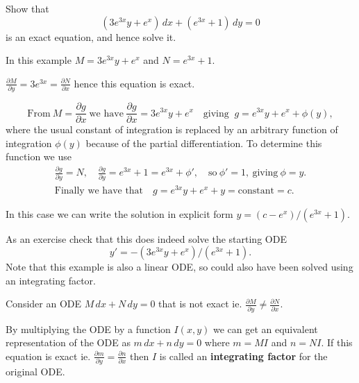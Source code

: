 \begin{example}
    Show that \[(3e^{3x}y+e^x)\,dx+(e^{3x}+1)\,dy=0\] is an exact equation, and hence solve it.
    
    In this example $M=3e^{3x}y+e^x$ and $N=e^{3x}+1.$

    $\frac{\partial M}{\partial y}=3e^{3x}=\frac{\partial N}{\partial x}$
    hence this equation is exact.

    \[\text{From} \ M=\frac{\partial g}{\partial x}\ \text{we have} \ \frac{\partial g}{\partial x}=3e^{3x}y+e^x \quad \text{giving } \ g=e^{3x}y+e^x+\phi(y),\]
    where the usual constant of integration is replaced by an arbitrary function of integration $\phi(y)$ because of the partial differentiation. To determine this function we use
    \begin{equation}
        \begin{gathered}
            \frac{\partial g}{\partial y}=N, \quad \frac{\partial g}{\partial y}=e^{3x}+1=e^{3x}+\phi', \quad \text{so} \ \phi'=1, \ \text{giving} \ \phi=y. \\
            \text{Finally we have that}\quad g=e^{3x}y+e^x+y=\text{constant}=c.
        \end{gathered}
    \end{equation}

    In this case we can write the solution in explicit form $y={(c-e^x)}/{(e^{3x}+1)}.$

    As an exercise check that this does indeed solve the starting ODE \[y'=-(3e^{3x}y+e^x)/(e^{3x}+1).\] Note that this example is also a linear ODE, so could also have been solved using an integrating factor.\\
\end{example}

Consider an ODE \quad $M\,dx+N\,dy=0$ \quad that is not exact ie. $\frac{\partial M}{\partial y}\ne\frac{\partial N}{\partial x}.$
 
By multiplying the ODE by a function $I(x,y)$ we can get an equivalent representation of the ODE as \quad $m\,dx+n\,dy=0$ \quad where $m=MI$ and $n=NI.$ If this equation is exact ie. $\frac{\partial m}{\partial y}=\frac{\partial n}{\partial x}$ then $I$ is called an \textbf{integrating factor} for the original ODE.\\

